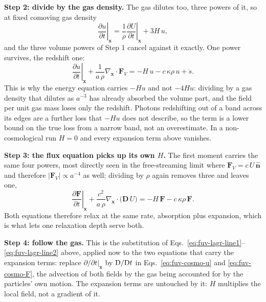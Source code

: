 \textbf{Step 2: divide by the gas density.} The gas dilutes too, three
powers of it, so at fixed comoving gas density
\begin{equation}
  \left.\frac{\partial u}{\partial t}\right|_{\mathbf x}
  = \frac{1}{\rho}\left.\frac{\partial U}{\partial t}\right|_{\mathbf x}
    + 3H\,u ,
  \label{eq:fuv-cosmo-divide}
\end{equation}
and the three volume powers of Step 1 cancel against it exactly. One power
survives, the redshift one:
\begin{equation}
  \left.\frac{\partial u}{\partial t}\right|_{\mathbf x}
  + \frac{1}{a\,\rho}\nabla_{\mathbf x}\cdot\mathbf F_V
  = -H\,u - c\,\kappa\rho\,u + \dot s .
  \label{eq:fuv-cosmo-u}
\end{equation}
This is why the energy equation carries $-Hu$ and not $-4Hu$: dividing by
a gas density that dilutes as $a^{-3}$ has already absorbed the volume
part, and the field per unit gas mass loses only the redshift. Photons
redshifting out of a band across its edges are a further loss that $-Hu$
does not describe, so the term is a lower bound on the true loss from a
narrow band, not an overestimate. In a non-cosmological run $H=0$ and every
expansion term above vanishes.

\textbf{Step 3: the flux equation picks up its own $H$.} The first moment
carries the same four powers, most directly seen in the free-streaming
limit where $\mathbf F_V = c\,U\,\hat{\mathbf n}$ and therefore
$|\mathbf F_V|\propto a^{-4}$ as well; dividing by $\rho$ again removes
three and leaves one,
\begin{equation}
  \left.\frac{\partial \mathbf F}{\partial t}\right|_{\mathbf x}
  + \frac{c^2}{a\,\rho}\nabla_{\mathbf x}\cdot\big(\mathbf D\,U\big)
  = -H\,\mathbf F - c\,\kappa\rho\,\mathbf F .
  \label{eq:fuv-cosmo-F}
\end{equation}
Both equations therefore relax at the same rate, absorption plus
expansion, which is what lets one relaxation depth serve both.

\textbf{Step 4: follow the gas.} This is the substitution of
Eqs.~\ref{eq:fuv-lagr-line1}--\ref{eq:fuv-lagr-line2} above, applied now to
the two equations that carry the expansion terms: replace
$\partial/\partial t|_{\mathbf x}$ by ${\rm D}/{\rm D}t$ in
Eqs.~\ref{eq:fuv-cosmo-u} and \ref{eq:fuv-cosmo-F}, the advection of both
fields by the gas being accounted for by the particles' own motion. The
expansion terms are untouched by it: $H$ multiplies the local field, not a
gradient of it.

